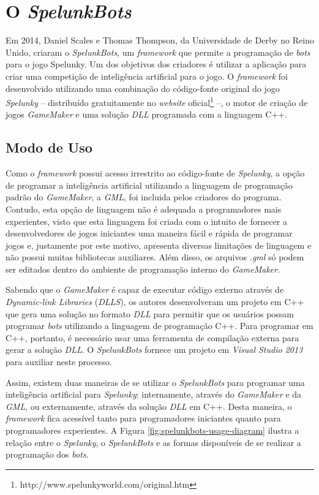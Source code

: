 \section{\label{section:spelunkbots}O \textit{SpelunkBots}}
Em 2014, Daniel Scales e Thomas Thompson, da Universidade de Derby no Reino
Unido, criaram o \textit{SpelunkBots}\cite{SPELUNKBOTSPAPER}, um
\textit{framework} que permite a programação de \textit{bots} para o jogo
Spelunky. Um dos objetivos dos criadores é utilizar a aplicação para criar uma
competição de inteligência artificial para o jogo. O \textit{framework} foi
desenvolvido utilizando uma combinação do código-fonte original do jogo
\textit{Spelunky} -- distribuído gratuitamente no \textit{website}
oficial\footnote{http://www.spelunkyworld.com/original.htm} --, o motor de
criação de jogos \textit{GameMaker} e uma solução \textit{DLL} programada com a
linguagem C++.


\subsection{\label{section:spelunkbots-usage}Modo de Uso}
Como o \textit{framework} possui acesso irrestrito ao código-fonte de
\textit{Spelunky}, a opção de programar a inteligência artificial utilizando a
linguagem de programação padrão do \textit{GameMaker}, a \textit{GML}, foi
incluida pelos criadores do programa. Contudo, esta opção de linguagem não é
adequada a programadores mais experientes, visto que esta linguagem foi criada
com o intuito de fornecer a desenvolvedores de jogos iniciantes uma maneira
fácil e rápida de programar jogos e, justamente por este motivo, apresenta
diversas limitações de linguagem e não possui muitas bibliotecas auxiliares.
Além disso, os arquivos \textit{.gml} só podem ser editados dentro do ambiente
de programação interno do \textit{GameMaker}.

Sabendo que o \textit{GameMaker} é capaz de executar código externo através de
\textit{Dynamic-link Libraries} (\textit{DLLS}), os autores desenvolveram um
projeto em C++ que gera uma solução no formato \textit{DLL} para permitir que os
usuários possam programar \textit{bots} utilizando a linguagem de programação
C++. Para programar em C++, portanto,  é necessário usar uma ferramenta de
compilação externa para gerar a solução \textit{DLL}. O \textit{SpelunkBots}
fornece um projeto em \textit{Visual Studio 2013} para auxiliar neste processo.

Assim, existem duas maneiras de se utilizar o \textit{SpelunkBots} para
programar uma inteligência artificial para \textit{Spelunky}: internamente,
através do \textit{GameMaker} e da \textit{GML}, ou externamente, através da
solução \textit{DLL} em C++. Desta maneira, o \textit{framework} fica acessível
tanto para programadores iniciantes quanto para programadores experientes.  A
Figura \ref{fig:spelunkbots-usage-diagram} ilustra a relação entre o
\textit{Spelunky}, o \textit{SpelunkBots} e as formas disponíveis de se realizar
a programação dos \textit{bots}.

